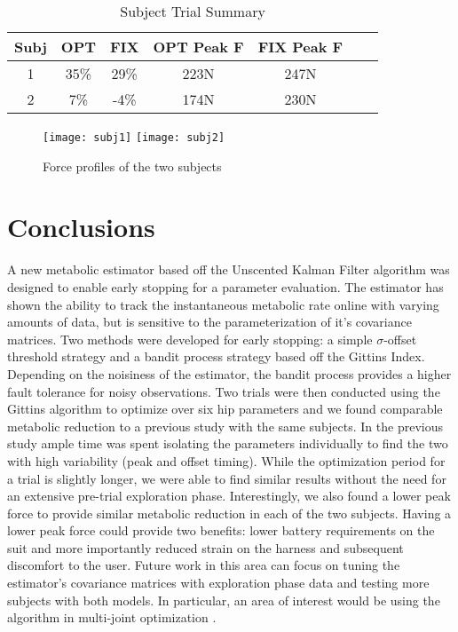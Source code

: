 \begin{table}
\centering
\begin{tabular}{ |c|c|c|c|c|c|c| } 
 \hline
 Subj & OPT & FIX & OPT Peak F & FIX Peak F\\ 
 \hline
 1 & 35\% & 29\% & 223N & 247N\\
 2 & 7\% & -4\% & 174N & 230N \\
 \hline
\end{tabular}%
\caption{Subject Trial Summary}
\label{fig:expsummary}
\end{table}

\begin{figure}[t]
\centering
\texttt{[image: subj1]}\hfill
\texttt{[image: subj2]}
\caption{Force profiles of the two subjects}
\label{fig:forceprofile}
\end{figure}

\section{Conclusions}
A new metabolic estimator based off the Unscented Kalman Filter algorithm was designed to enable early stopping for a parameter evaluation. The estimator has shown the ability to track the instantaneous metabolic rate online with varying amounts of data, but is sensitive to the parameterization of it's covariance matrices. Two methods were developed for early stopping: a simple $\sigma$-offset threshold strategy and a bandit process strategy based off the Gittins Index. Depending on the noisiness of the estimator, the bandit process provides a higher fault tolerance for noisy observations. Two trials were then conducted using the Gittins algorithm to optimize over six hip parameters and we found comparable metabolic reduction to a previous study with the same subjects. In the previous study ample time was spent isolating the parameters individually to find the two with high variability (peak and offset timing). While the optimization period for a trial is slightly longer, we were able to find similar results without the need for an extensive pre-trial exploration phase. Interestingly, we also found a lower peak force to provide similar metabolic reduction in each of the two subjects. Having a lower peak force could provide two benefits: lower battery requirements on the suit and more importantly reduced strain on the harness and subsequent discomfort to the user. Future work in this area can focus on tuning the estimator's covariance matrices with exploration phase data and testing more subjects with both models. In particular, an area of interest would be using the algorithm in multi-joint optimization \citep{1298569}.